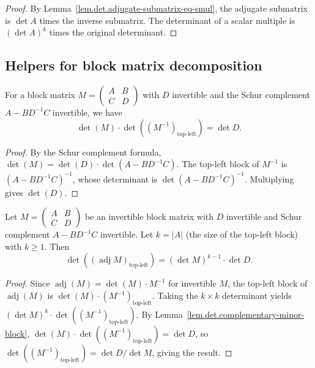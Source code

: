 \begin{proof}
By Lemma~\ref{lem.det.adjugate-submatrix-eq-smul}, the adjugate submatrix
is $\det A$ times the inverse submatrix. The determinant of a scalar
multiple is $(\det A)^k$ times the original determinant.
\end{proof}

\subsection{Helpers for block matrix decomposition}

\begin{lemma}
\label{lem.det.complementary-minor-block}
\leanhelper
\leanok
For a block matrix $M = \begin{pmatrix} A & B \\ C & D \end{pmatrix}$ with $D$
invertible and the Schur complement $A - BD^{-1}C$ invertible, we have
\[
  \det(M) \cdot \det\!\left((M^{-1})_{\text{top-left}}\right) = \det D.
\]
\end{lemma}

\begin{proof}
By the Schur complement formula, $\det(M) = \det(D) \cdot \det(A - BD^{-1}C)$.
The top-left block of $M^{-1}$ is $(A - BD^{-1}C)^{-1}$, whose determinant
is $\det(A - BD^{-1}C)^{-1}$. Multiplying gives $\det(D)$.
\end{proof}

\begin{lemma}
\label{lem.det.adjugate-toBlocks11}
\leanhelper
\leanok
Let $M = \begin{pmatrix} A & B \\ C & D \end{pmatrix}$ be an invertible
block matrix with $D$ invertible and Schur complement $A - BD^{-1}C$
invertible. Let $k = |A|$ (the size of the top-left block) with $k \geq 1$.
Then
\[
  \det\!\left((\operatorname{adj} M)_{\text{top-left}}\right)
  = (\det M)^{k-1} \cdot \det D.
\]
\end{lemma}

\begin{proof}
Since $\operatorname{adj}(M) = \det(M) \cdot M^{-1}$ for invertible $M$,
the top-left block of $\operatorname{adj}(M)$ is
$\det(M) \cdot (M^{-1})_{\text{top-left}}$. Taking the $k \times k$
determinant yields $(\det M)^k \cdot \det((M^{-1})_{\text{top-left}})$.
By Lemma~\ref{lem.det.complementary-minor-block},
$\det(M) \cdot \det((M^{-1})_{\text{top-left}}) = \det D$,
so $\det((M^{-1})_{\text{top-left}}) = \det D / \det M$, giving the result.
\end{proof}

